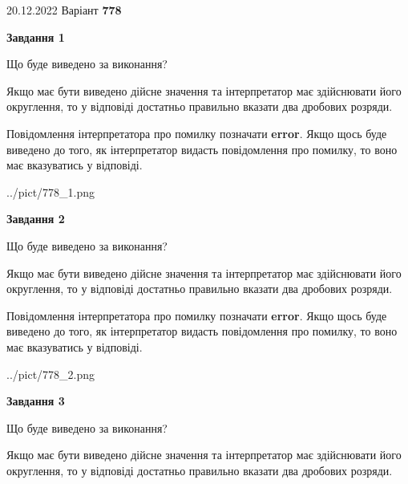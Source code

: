 \documentclass[12pt, ukrainian]{article}
\begin{document}
{20.12.2022 Варіант \No \textbf { 778 }\par}
{
\begin {Large}

{\begin {center}\textbf{Завдання 1}\end {center}}\par
Що буде виведено за виконання? \par

Якщо має бути виведено дійсне значення та інтерпретатор має здійснювати його округлення, 
то у відповіді достатньо правильно вказати два дробових розряди.

Повідомлення інтерпретатора про помилку позначати \textbf{error}.
Якщо щось буде виведено до того, як інтерпретатор видасть повідомлення про помилку, 
то воно має вказуватись у відповіді. \par

\begin{center}
	{../pict/778_1.png}
\end{center}
\newpage

{\begin {center}\textbf{Завдання 2}\end {center}}\par
Що буде виведено за виконання? \par

Якщо має бути виведено дійсне значення та інтерпретатор має здійснювати його округлення, 
то у відповіді достатньо правильно вказати два дробових розряди.

Повідомлення інтерпретатора про помилку позначати \textbf{error}.
Якщо щось буде виведено до того, як інтерпретатор видасть повідомлення про помилку, 
то воно має вказуватись у відповіді. \par

\begin{center}
	{../pict/778_2.png}
\end{center}
\newpage

{\begin {center}\textbf{Завдання 3}\end {center}}\par
Що буде виведено за виконання? \par

Якщо має бути виведено дійсне значення та інтерпретатор має здійснювати його округлення, 
то у відповіді достатньо правильно вказати два дробових розряди.


\end{Large}}
\end{document}
